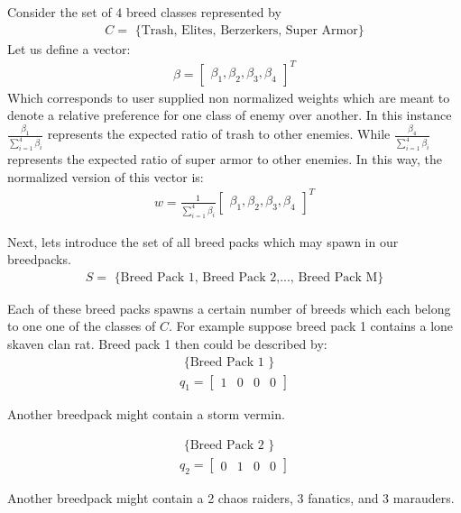 \documentclass[12pt]{article}
\begin{document}
Consider the set of $4$ breed classes represented by
\begin{align*}
C = \text{ \{Trash, Elites, Berzerkers, Super Armor\} }
\end{align*}
Let us define a vector:
\begin{align*}
{\beta} = \begin{bmatrix} \beta_1, \beta_2, \beta_3, \beta_4 \end{bmatrix}^T
\end{align*}
Which corresponds to user supplied non normalized weights which are meant to denote a relative preference for one class of enemy over another.
In this instance $\frac{\beta_1}{\sum_{i=1}^{4} \beta_i}$ represents the expected ratio of trash to other enemies. While $\frac{\beta_4}{\sum_{i=1}^{4} \beta_i}$ represents the expected ratio of super armor to other enemies.
In this way, the normalized version of this vector is:
\begin{align*}
w = \frac{1}{\sum_{i=1}^{4} \beta_i} \begin{bmatrix} \beta_1, \beta_2, \beta_3, \beta_4 \end{bmatrix}^T
\end{align*}

Next, lets introduce the set of all breed packs which may spawn in our breedpacks.
\begin{align*}
S = \text{ \{Breed Pack 1, Breed Pack 2,..., Breed Pack M\} }
\end{align*}

Each of these breed packs spawns a certain number of breeds which each belong to one one of the classes of $C$. For example suppose breed pack 1 contains a lone skaven clan rat. Breed pack 1 then could be described by:
\begin{align*}
\text{ \{Breed Pack 1 \}} \\
q_1 = \begin{bmatrix}
1 & 0 & 0 & 0
\end{bmatrix}
\end{align*}

Another breedpack might contain a storm vermin.

\begin{align*}
\text{ \{Breed Pack 2 \}} \\ 
q_2 = \begin{bmatrix}
0 & 1 & 0 & 0
\end{bmatrix}
\end{align*}

Another breedpack might contain a 2 chaos raiders, 3 fanatics, and 3 marauders.
\end{document}
